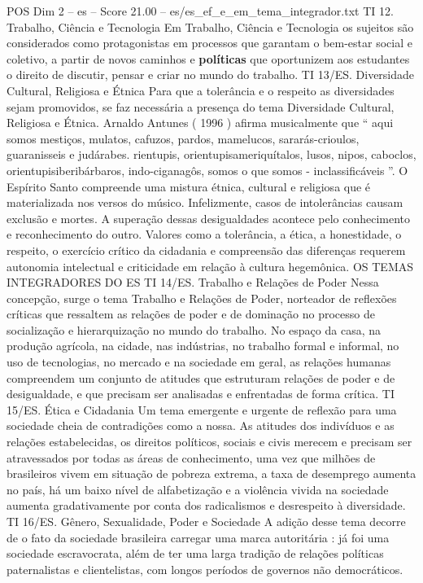 \begin{textsample}{POS Dim 2 – es – Score 21.00 – es/es\_ef\_e\_em\_tema\_integrador.txt}
TI 12.
Trabalho, Ciência e Tecnologia Em Trabalho, Ciência e Tecnologia os sujeitos são considerados como protagonistas em processos que garantam o bem-estar social e coletivo, a partir de novos caminhos e \textbf{políticas} que oportunizem aos estudantes o direito de discutir, pensar e criar no mundo do trabalho.
TI 13/ES.
Diversidade Cultural, Religiosa e Étnica Para que a tolerância e o respeito as diversidades sejam promovidos, se faz necessária a presença do tema Diversidade Cultural, Religiosa e Étnica.
Arnaldo Antunes ( 1996 ) afirma musicalmente que “ aqui somos mestiços, mulatos, cafuzos, pardos, mamelucos, sararás-crioulos, guaranisseis e judárabes. rientupis, orientupisameriquítalos, lusos, nipos, caboclos, orientupisiberibárbaros, indo-ciganagôs, somos o que somos - inclassificáveis ”.
O Espírito Santo compreende uma mistura étnica, cultural e religiosa que é materializada nos versos do músico.
Infelizmente, casos de intolerâncias causam exclusão e mortes.
A superação dessas desigualdades acontece pelo conhecimento e reconhecimento do outro.
Valores como a tolerância, a ética, a honestidade, o respeito, o exercício crítico da cidadania e compreensão das diferenças requerem autonomia intelectual e criticidade em relação à cultura hegemônica.
OS TEMAS INTEGRADORES DO ES TI 14/ES.
Trabalho e Relações de Poder Nessa concepção, surge o tema Trabalho e Relações de Poder, norteador de reflexões críticas que ressaltem as relações de poder e de dominação no processo de socialização e hierarquização no mundo do trabalho.
No espaço da casa, na produção agrícola, na cidade, nas indústrias, no trabalho formal e informal, no uso de tecnologias, no mercado e na sociedade em geral, as relações humanas compreendem um conjunto de atitudes que estruturam relações de poder e de desigualdade, e que precisam ser analisadas e enfrentadas de forma crítica.
TI 15/ES.
Ética e Cidadania Um tema emergente e urgente de reflexão para uma sociedade cheia de contradições como a nossa.
As atitudes dos indivíduos e as relações estabelecidas, os direitos políticos, sociais e civis merecem e precisam ser atravessados por todas as áreas de conhecimento, uma vez que milhões de brasileiros vivem em situação de pobreza extrema, a taxa de desemprego aumenta no país, há um baixo nível de alfabetização e a violência vivida na sociedade aumenta gradativamente por conta dos radicalismos e desrespeito à diversidade.
TI 16/ES.
Gênero, Sexualidade, Poder e Sociedade A adição desse tema decorre de o fato da sociedade brasileira carregar uma marca autoritária : já foi uma sociedade escravocrata, além de ter uma larga tradição de relações políticas paternalistas e clientelistas, com longos períodos de governos não democráticos.

\end{textsample}

